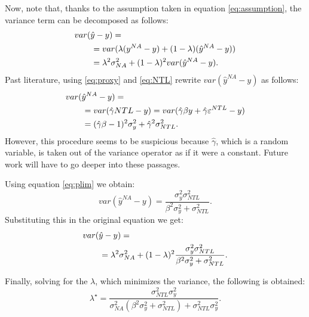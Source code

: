 Now, note that, thanks to the assumption taken in equation \ref{eq:assumption}, the variance term can be decomposed as follows:
\begin{equation}
    \begin{split}
        \MoveEqLeft
        var(\hat{y}-y)=\\
        &= var(\lambda(y^{NA}-y)+(1-\lambda)(\hat{y}^{NA}-y))\\
        &= \lambda^2 \sigma^2_{NA}+(1-\lambda)^2 var(\hat{y}^{NA}-y).
    \end{split}
\end{equation}
Past literature, using \ref{eq:proxy} and \ref{eq:NTL} rewrite $var(\hat{y}^{NA}-y)$ as follows:
\begin{equation}
    \begin{split}
        \MoveEqLeft
        var(\hat{y}^{NA}-y)=\\
        &= var(\hat{\gamma}NTL-y)=var(\hat{\gamma} \beta y+
        \hat{\gamma}\varepsilon^{NTL}-y)\\
        &=(\hat{\gamma}\beta -1)^2\sigma^2_y+\hat{\gamma}^2\sigma^2_{NTL}.
        \end{split}
\end{equation}
However, this procedure seems to be suspicious because $\hat{\gamma}$, which is a random variable, is taken out of the variance operator as if it were a constant. Future work will have to go deeper into these passages.

Using equation \ref{eq:plim} we obtain:
\begin{equation}
    var(\hat{y}^{NA}-y)= \frac{\sigma_y^2\sigma_{NTL}^2}{\beta^2\sigma_y^2+\sigma_{NTL}^2}.
\end{equation}
Substituting this in the original equation we get:
\begin{equation}
    \begin{split}
        \MoveEqLeft
        var(\hat{y}-y)=\\
        &= \lambda^2 \sigma^2_{NA}+(1-\lambda)^2 \frac{\sigma_y^2\sigma_{NTL}^2}{\beta^2\sigma_y^2+\sigma_{NTL}^2}.
    \end{split}
\end{equation}

Finally, solving for the $\lambda$, which minimizes the variance, the following is obtained:
\begin{equation}
\label{eq:lambda}
    \lambda^\star=\frac{\sigma^2_{NTL}\sigma^2_y}{\sigma^2_{NA}(\beta^2\sigma^2_y+\sigma_{NTL}^2)+\sigma^2_{NTL}\sigma^2_y}.
\end{equation}

